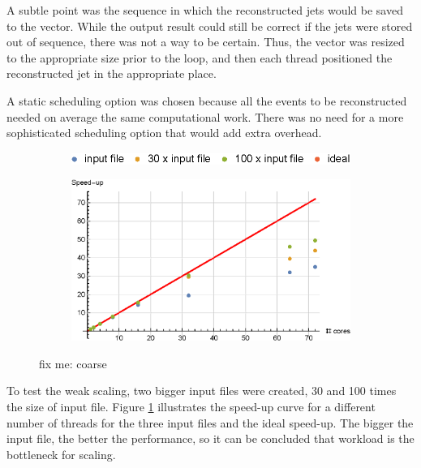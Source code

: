A subtle point was the sequence in which the reconstructed jets would be saved to the vector. While the output result could still be correct if the jets were stored out of sequence, there was not a way to be certain. Thus, the vector was resized to the appropriate size prior to the loop, and then each thread positioned the reconstructed  jet in the appropriate place.

A static scheduling option was chosen because all the events to be reconstructed needed on average the same computational work. There was no need for a more sophisticated scheduling option that would add extra overhead.

\begin{figure}[H]
    \centering
    \begin{subfigure}{\textwidth}
        \includegraphics[width=1\linewidth]{images/coarseplotlegend.eps}
    \end{subfigure}
    
    \begin{subfigure}{\textwidth}
        \includegraphics[width=1\linewidth]{images/coarseplot.eps}
    \end{subfigure}
    \caption{fix me: coarse}
    \label{fig:coarse}
\end{figure}

To test the weak scaling, two bigger input files were created, 30 and 100 times the size of input file. Figure \ref{fig:coarse} illustrates the speed-up curve for a different number of threads for the three input files and the ideal speed-up. The bigger the input file, the better the performance, so it can be concluded that workload is the bottleneck for scaling.

